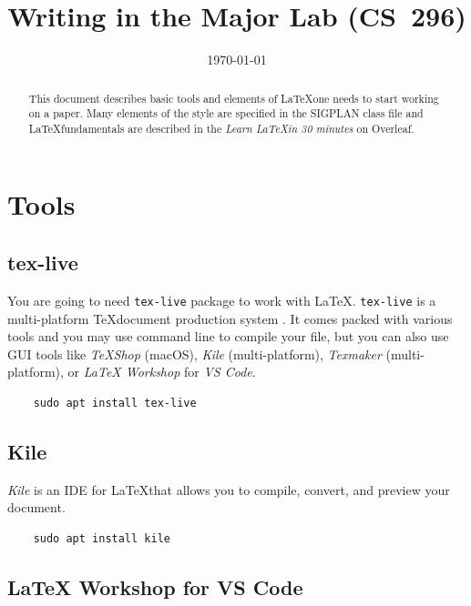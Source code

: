 \documentclass[11pt]{sigplanconf}
\title{Writing in the Major Lab (CS~296)}
\date{\today}
\begin{document}
\maketitle

\tableofcontents

\begin{abstract}

    This document describes basic tools and elements of \LaTeX one needs to start working on a paper. Many elements of the style are specified in the SIGPLAN class file\cite{SIGPLANL45:online} and \LaTeX fundamentals are described in the \textit{Learn \LaTeX in 30 minutes} on Overleaf\cite{LearnLaT95:online}.

\end{abstract}

\section{Tools}

\subsection{tex-live}

You are going to need \texttt{tex-live} package to work with \LaTeX. \texttt{tex-live} is a multi-platform \TeX document production system \cite{TeXLiveT67:online}. It comes packed with various tools and you may use command line to compile your file, but you can also use GUI tools like \textit{TeXShop} (macOS), \textit{Kile} (multi-platform), \textit{Texmaker} (multi-platform), or \textit{LaTeX Workshop} for \textit{VS Code}.

\begin{verbatim}
    sudo apt install tex-live
\end{verbatim}

\subsection{Kile}

\textit{Kile} is an IDE for \LaTeX that allows you to compile, convert, and preview your document\cite{KileanIn6:online}.

\begin{verbatim}
    sudo apt install kile
\end{verbatim}

\subsection{LaTeX Workshop for VS Code}
\end{document}
